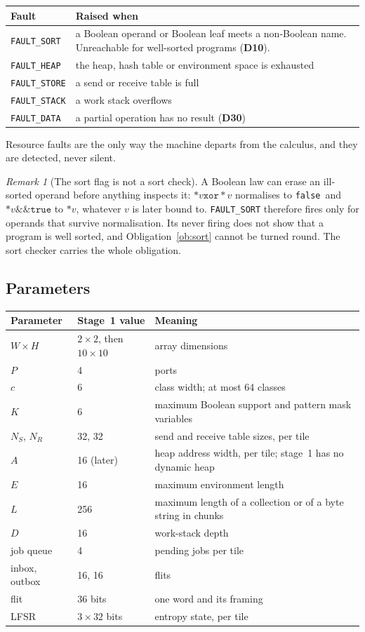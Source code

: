 \documentclass[11pt]{article}
\newcommand{\kw}[1]{\texttt{#1}}
\newcommand{\tru}{\kw{true}}
\newcommand{\fls}{\kw{false}}
\newcommand{\band}{\mathbin{\&\&}}
\newcommand{\bxor}{\mathbin{\kw{xor}}}
\newcommand{\drp}[1]{{*}#1}
\newcommand{\dec}[1]{\textbf{D#1}}
\theoremstyle{definition}
\theoremstyle{remark}
\newtheorem{remark}{Remark}
\begin{document}
\medskip\noindent
\begin{tabularx}{\textwidth}{@{}l X@{}}
\toprule
Fault & Raised when\\
\midrule
\kw{FAULT\_SORT} & a Boolean operand or Boolean leaf meets a non-Boolean
                   name. Unreachable for well-sorted programs (\dec{10}).\\
\kw{FAULT\_HEAP} & the heap, hash table or environment space is exhausted\\
\kw{FAULT\_STORE} & a send or receive table is full\\
\kw{FAULT\_STACK} & a work stack overflows\\
\kw{FAULT\_DATA} & a partial operation has no result (\dec{30})\\
\bottomrule
\end{tabularx}

\medskip\noindent
Resource faults are the only way the machine departs from the calculus, and
they are detected, never silent.

\begin{remark}[The sort flag is not a sort check]
A Boolean law can erase an ill-sorted operand before anything inspects it:
$\drp{v} \bxor \drp{v}$ normalises to \fls\ and $\drp{v} \band \tru$ to
$\drp{v}$, whatever $v$ is later bound to. \kw{FAULT\_SORT} therefore fires
only for operands that survive normalisation. Its never firing does not show
that a program is well sorted, and Obligation~\ref{ob:sort} cannot be turned
round. The sort checker carries the whole obligation.
\end{remark}

\subsection{Parameters}

\noindent
\begin{tabularx}{\textwidth}{@{}l l X@{}}
\toprule
Parameter & Stage~1 value & Meaning\\
\midrule
$W \times H$ & $2 \times 2$, then $10 \times 10$ & array dimensions\\
$P$ & 4 & ports\\
$c$ & 6 & class width; at most 64 classes\\
$K$ & 6 & maximum Boolean support and pattern mask variables\\
$N_S$, $N_R$ & 32, 32 & send and receive table sizes, per tile\\
$A$ & 16 (later) & heap address width, per tile; stage~1 has no dynamic heap\\
$E$ & 16 & maximum environment length\\
$L$ & 256 & maximum length of a collection or of a byte string in chunks\\
$D$ & 16 & work-stack depth\\
job queue & 4 & pending jobs per tile\\
inbox, outbox & 16, 16 & flits\\
flit & 36 bits & one word and its framing\\
LFSR & $3 \times 32$ bits & entropy state, per tile\\
\bottomrule
\end{tabularx}
\end{document}
